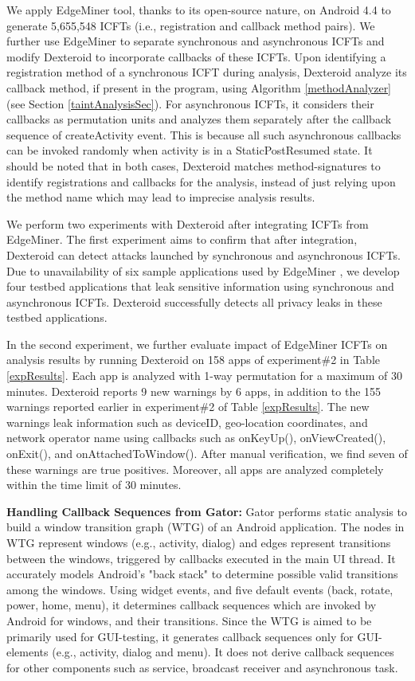 \documentclass[10pt]{elsarticle}
\begin{document}
	We apply EdgeMiner tool, thanks to its open-source nature, on Android 4.4 to generate 5,655,548 ICFTs (i.e., registration and callback method pairs). We further use EdgeMiner to separate synchronous and asynchronous ICFTs and modify Dexteroid to incorporate callbacks of these ICFTs. Upon identifying a registration method of a synchronous ICFT during analysis, Dexteroid analyze its callback method, if present in the program, using Algorithm \ref{methodAnalyzer} (see Section \ref{taintAnalysisSec}). For asynchronous ICFTs, it considers their callbacks as permutation units and analyzes them separately after the callback sequence of createActivity event. This is because all such asynchronous callbacks can be invoked randomly when activity is in a StaticPostResumed state. It should be noted that in both cases, Dexteroid matches method-signatures to identify registrations and callbacks for the analysis, instead of just relying upon the method name which may lead to imprecise analysis results.
	
	We perform two experiments with Dexteroid after integrating ICFTs from EdgeMiner. The first experiment aims to confirm that after integration, Dexteroid can detect attacks launched by synchronous and asynchronous ICFTs. Due to unavailability of six sample applications used by EdgeMiner \cite{YCao}, we develop four testbed applications that leak sensitive information using synchronous and asynchronous ICFTs. Dexteroid successfully detects all privacy leaks in these testbed applications. 
	
	In the second experiment, we further evaluate impact of EdgeMiner ICFTs on analysis results by running Dexteroid on 158 apps of experiment\#2 in Table \ref{expResults}. Each app is analyzed with 1-way permutation for a maximum of 30 minutes. Dexteroid reports 9 new warnings by 6 apps, in addition to the 155 warnings reported earlier in experiment\#2 of Table \ref{expResults}. The new warnings leak information such as deviceID, geo-location coordinates, and network operator name using callbacks such as {\ttfamily onKeyUp()}, {\ttfamily onViewCreated()}, {\ttfamily onExit()}, and {\ttfamily onAttachedToWindow()}. After manual verification, we find seven of these warnings are true positives. Moreover, all apps are analyzed completely within the time limit of 30 minutes. 


{\noindent \bf Handling Callback Sequences from Gator:} Gator \cite{GATORWTG} performs static analysis to build a window transition graph (WTG) of an Android application. The nodes in WTG represent windows (e.g., activity, dialog) and edges represent transitions between the windows, triggered by callbacks executed in the main UI thread. It accurately models Android's "back stack" \cite{BackStack} to determine possible valid transitions among the windows. Using widget events, and five default events (back, rotate, power, home, menu), it determines callback sequences which are invoked by Android for windows, and their transitions. Since the WTG is aimed to be primarily used for GUI-testing, it generates callback sequences only for GUI-elements (e.g., activity, dialog and menu). It does not derive callback sequences for other components such as service, broadcast receiver and asynchronous task. 
\end{document}

